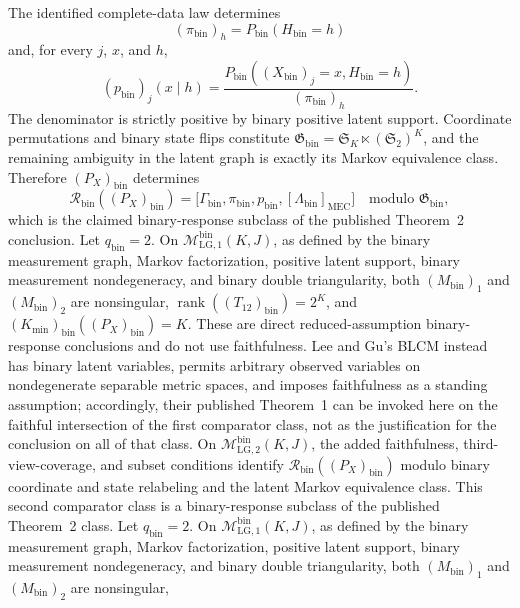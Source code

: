 The identified complete-data law determines
\[
 (\pi_{\mathrm{bin}})_h=P_{\mathrm{bin}}(H_{\mathrm{bin}}=h)
\]
and, for every \(j\), \(x\), and \(h\),
\[
 (p_{\mathrm{bin}})_j(x\mid h)
 =\frac{P_{\mathrm{bin}}((X_{\mathrm{bin}})_j=x,
                         H_{\mathrm{bin}}=h)}
        {(\pi_{\mathrm{bin}})_h}.
\]
The denominator is strictly positive by binary positive latent support.
Coordinate permutations and binary state flips constitute
\(\mathfrak G_{\mathrm{bin}}=\mathfrak S_K\ltimes(\mathfrak S_2)^K\), and
the remaining ambiguity in the latent graph is exactly its Markov equivalence
class.  Therefore \((P_X)_{\mathrm{bin}}\) determines
\[
 \mathcal R_{\mathrm{bin}}((P_X)_{\mathrm{bin}})
 =\bigl[\Gamma_{\mathrm{bin}},\pi_{\mathrm{bin}},p_{\mathrm{bin}},
        [\Lambda_{\mathrm{bin}}]_{\mathrm{MEC}}\bigr]
 \quad\text{modulo }\mathfrak G_{\mathrm{bin}},
\]
which is the claimed binary-response subclass of the published Theorem~2
conclusion.
Let \(q_{\mathrm{bin}}=2\).  On
\(\mathcal M_{\mathrm{LG},1}^{\mathrm{bin}}(K,J)\), as defined by the binary
measurement graph, Markov factorization, positive latent support, binary
measurement nondegeneracy, and binary double triangularity, both
\((M_{\mathrm{bin}})_1\) and \((M_{\mathrm{bin}})_2\) are nonsingular,
\(\operatorname{rank}((T_{12})_{\mathrm{bin}})=2^K\), and
\((K_{\min})_{\mathrm{bin}}((P_X)_{\mathrm{bin}})=K\).  These are direct
reduced-assumption binary-response conclusions and do not use faithfulness.
Lee and Gu's BLCM instead has binary latent variables, permits arbitrary
observed variables on nondegenerate separable metric spaces, and imposes
faithfulness as a standing assumption; accordingly, their published
Theorem~1 can be invoked here on the faithful intersection of the first
comparator class, not as the justification for the conclusion on all of that
class.  On
\(\mathcal M_{\mathrm{LG},2}^{\mathrm{bin}}(K,J)\), the added faithfulness,
third-view-coverage, and subset conditions identify
\(\mathcal R_{\mathrm{bin}}((P_X)_{\mathrm{bin}})\) modulo binary coordinate
and state relabeling and the latent Markov equivalence class.  This second
comparator class is a binary-response subclass of the published Theorem~2
class.
Let \(q_{\mathrm{bin}}=2\).  On
\(\mathcal M_{\mathrm{LG},1}^{\mathrm{bin}}(K,J)\), as defined by the binary
measurement graph, Markov factorization, positive latent support, binary
measurement nondegeneracy, and binary double triangularity, both
\((M_{\mathrm{bin}})_1\) and \((M_{\mathrm{bin}})_2\) are nonsingular,
